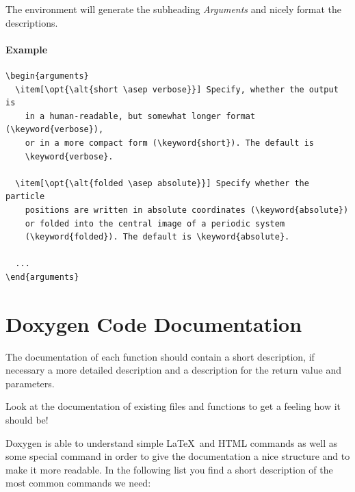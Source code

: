 \documentclass[
a4paper,                        %
11pt,                           %
twoside,                        %
footsepline,                    %
headsepline,                    %
headexclude,                    %
footexclude,                    %
pagesize,                       %
bibtotocnumbered,               %
idxtotoc                        %
]{scrreprt}
\begin{document}
The environment will generate the subheading \emph{Arguments} and
nicely format the descriptions.

\paragraph{Example}
\begin{verbatim}
\begin{arguments}
  \item[\opt{\alt{short \asep verbose}}] Specify, whether the output is
    in a human-readable, but somewhat longer format (\keyword{verbose}),
    or in a more compact form (\keyword{short}). The default is
    \keyword{verbose}.
  
  \item[\opt{\alt{folded \asep absolute}}] Specify whether the particle
    positions are written in absolute coordinates (\keyword{absolute})
    or folded into the central image of a periodic system
    (\keyword{folded}). The default is \keyword{absolute}.
  
  ...
\end{arguments}
\end{verbatim}

\section{Doxygen Code Documentation}
\label{sec:doxygen}

The documentation of each function should contain a short description,
if necessary a more detailed description and a description for the
return value and parameters.

Look at the documentation of existing files and functions to get a
feeling how it should be!

Doxygen is able to understand simple \LaTeX\ and HTML commands as well
as some special command in order to give the documentation a nice
structure and to make it more readable. In the following list you find
a short description of the most common commands we need:
\end{document}

